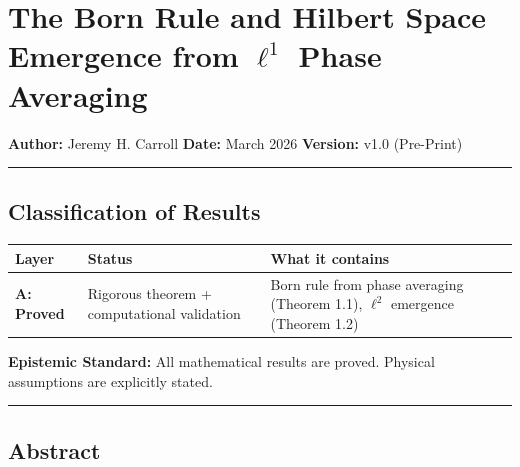\documentclass[
]{article}
\author{}
\date{}
\begin{document}
\section{\texorpdfstring{The Born Rule and Hilbert Space Emergence from
\(\ell^1\) Phase
Averaging}{The Born Rule and Hilbert Space Emergence from \textbackslash ell\^{}1 Phase Averaging}}\label{the-born-rule-and-hilbert-space-emergence-from-ell1-phase-averaging}

\textbf{Author:} Jeremy H. Carroll \textbf{Date:} March 2026
\textbf{Version:} v1.0 (Pre-Print)

\begin{center}\rule{0.5\linewidth}{0.5pt}\end{center}

\subsection{Classification of Results}\label{classification-of-results}

\begin{longtable}[]{@{}
  >{\raggedright\arraybackslash}p{}
  >{\raggedright\arraybackslash}p{}
  >{\raggedright\arraybackslash}p{}@{}}
\toprule\noalign{}
\begin{minipage}[b]{\linewidth}\raggedright
Layer
\end{minipage} & \begin{minipage}[b]{\linewidth}\raggedright
Status
\end{minipage} & \begin{minipage}[b]{\linewidth}\raggedright
What it contains
\end{minipage} \\
\midrule\noalign{}
\endhead
\bottomrule\noalign{}
\endlastfoot
\textbf{A: Proved} & Rigorous theorem + computational validation & Born
rule from phase averaging (Theorem 1.1), \(\ell^2\) emergence (Theorem
1.2) \\
\end{longtable}

\textbf{Epistemic Standard:} All mathematical results are proved.
Physical assumptions are explicitly stated.

\begin{center}\rule{0.5\linewidth}{0.5pt}\end{center}

\subsection{Abstract}\label{abstract}
\end{document}
